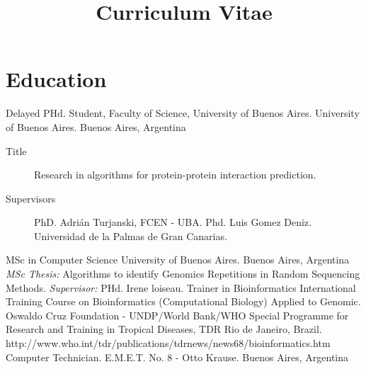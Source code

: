 \documentclass[9pt,a4paper,sans]{moderncv}
\title{Curriculum Vitae}
\newcommand{\FCEN}{Faculty of Science}
\newcommand{\UBA}{University of Buenos Aires}
\newcommand{\CS}{MSc in Computer Science}
\begin{document}
\makecvtitle

\section{Education}\label{otros:desde}

	{Delayed PHd. Student, \FCEN, \UBA.}
	{\UBA.}
	{Buenos Aires, Argentina}
	{}
	{\begin{description}
	\item [Title] Research in algorithms for protein-protein interaction prediction.
	\item [Supervisors] PhD. Adrián Turjanski, FCEN - UBA. Phd. Luis Gomez Deniz. Universidad de la Palmas de Gran Canarias.
	\end{description}}
	{\CS}
	{\UBA.}
	{Buenos Aires, Argentina}
	{}
	{\emph{MSc Thesis:} Algorithms to identify Genomics Repetitions in Random Sequencing Methods. \emph{Supervisor:} PHd. Irene loiseau.}
	{Trainer in Bioinformatics}
	{International Training Course on Bioinformatics (Computational Biology) Applied to Genomic. Oswaldo Cruz Foundation - UNDP/World Bank/WHO Special Programme for Research and Training in Tropical Diseases, TDR}
	{Rio de Janeiro, Brazil.}
	{}
	{http://www.who.int/tdr/publications/tdrnews/news68/bioinformatics.htm}
	{Computer Technician.}
	{E.M.E.T. No. 8 - Otto Krause.}
	{Buenos Aires, Argentina}
	{}
	{}
\end{document}
